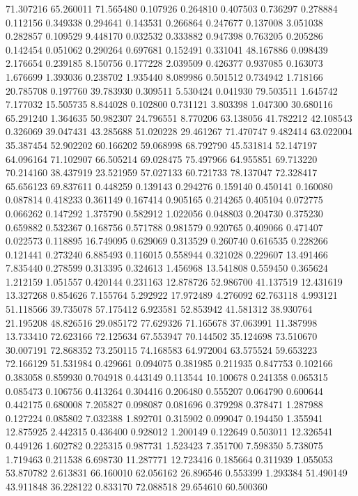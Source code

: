 71.307216
65.260011
71.565480
0.107926
0.264810
0.407503
0.736297
0.278884
0.112156
0.349338
0.294641
0.143531
0.266864
0.247677
0.137008
3.051038
0.282857
0.109529
9.448170
0.032532
0.333882
0.947398
0.763205
0.205286
0.142454
0.051062
0.290264
0.697681
0.152491
0.331041
48.167886
0.098439
2.176654
0.239185
8.150756
0.177228
2.039509
0.426377
0.937085
0.163073
1.676699
1.393036
0.238702
1.935440
8.089986
0.501512
0.734942
1.718166
20.785708
0.197760
39.783930
0.309511
5.530424
0.041930
79.503511
1.645742
7.177032
15.505735
8.844028
0.102800
0.731121
3.803398
1.047300
30.680116
65.291240
1.364635
50.982307
24.796551
8.770206
63.138056
41.782212
42.108543
0.326069
39.047431
43.285688
51.020228
29.461267
71.470747
9.482414
63.022004
35.387454
52.902202
60.166202
59.068998
68.792790
45.531814
52.147197
64.096164
71.102907
66.505214
69.028475
75.497966
64.955851
69.713220
70.214160
38.437919
23.521959
57.027133
60.721733
78.137047
72.328417
65.656123
69.837611
0.448259
0.139143
0.294276
0.159140
0.450141
0.160080
0.087814
0.418233
0.361149
0.167414
0.905165
0.214265
0.405104
0.072775
0.066262
0.147292
1.375790
0.582912
1.022056
0.048803
0.204730
0.375230
0.659882
0.532367
0.168756
0.571788
0.981579
0.920765
0.409066
0.471407
0.022573
0.118895
16.749095
0.629069
0.313529
0.260740
0.616535
0.228266
0.121441
0.273240
6.885493
0.116015
0.558944
0.321028
0.229607
13.491466
7.835440
0.278599
0.313395
0.324613
1.456968
13.541808
0.559450
0.365624
1.212159
1.051557
0.420144
0.231163
12.878726
52.986700
41.137519
12.431619
13.327268
0.854626
7.155764
5.292922
17.972489
4.276092
62.763118
4.993121
51.118566
39.735078
57.175412
6.923581
52.853942
41.581312
38.930764
21.195208
48.826516
29.085172
77.629326
71.165678
37.063991
11.387998
13.733410
72.623166
72.125634
67.553947
70.144502
35.124698
73.510670
30.007191
72.868352
73.250115
74.168583
64.972004
63.575524
59.653223
72.166129
51.531984
0.429661
0.094075
0.381985
0.211935
0.847753
0.102166
0.383058
0.859930
0.704918
0.443149
0.113544
10.100678
0.241358
0.065315
0.085473
0.106756
0.413264
0.304416
0.206480
0.555207
0.064790
0.600644
0.442175
0.680008
7.205827
0.098087
0.081696
0.379298
0.378471
1.287988
0.127224
0.085802
7.032388
1.892701
0.315902
0.099047
0.194450
1.355941
12.875925
2.442315
0.436400
0.928012
1.200149
0.122649
0.503011
12.326541
0.449126
1.602782
0.225315
0.987731
1.523423
7.351700
7.598350
5.738075
1.719463
0.211538
6.698730
11.287771
12.723416
0.185664
0.311939
1.055053
53.870782
2.613831
66.160010
62.056162
26.896546
0.553399
1.293384
51.490149
43.911848
36.228122
0.833170
72.088518
29.654610
60.500360
